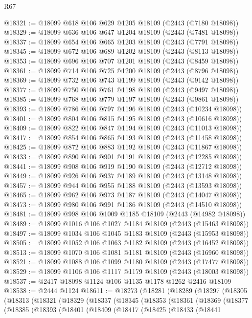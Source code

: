 \begin{lexlean}{R67}
\begin{coremodule}
@18321 := @18099 @618 @106 @629 @1205 @18109 (@2443 (@7180 @18098))
@18329 := @18099 @636 @106 @647 @1204 @18109 (@2443 (@7481 @18098))
@18337 := @18099 @654 @106 @665 @1203 @18109 (@2443 (@7791 @18098))
@18345 := @18099 @672 @106 @689 @1202 @18109 (@2443 (@8113 @18098))
@18353 := @18099 @696 @106 @707 @1201 @18109 (@2443 (@8459 @18098))
@18361 := @18099 @714 @106 @725 @1200 @18109 (@2443 (@8796 @18098))
@18369 := @18099 @732 @106 @743 @1199 @18109 (@2443 (@9142 @18098))
@18377 := @18099 @750 @106 @761 @1198 @18109 (@2443 (@9497 @18098))
@18385 := @18099 @768 @106 @779 @1197 @18109 (@2443 (@9861 @18098))
@18393 := @18099 @786 @106 @797 @1196 @18109 (@2443 (@10234 @18098))
@18401 := @18099 @804 @106 @815 @1195 @18109 (@2443 (@10616 @18098))
@18409 := @18099 @822 @106 @847 @1194 @18109 (@2443 (@11013 @18098))
@18417 := @18099 @854 @106 @865 @1193 @18109 (@2443 (@11458 @18098))
@18425 := @18099 @872 @106 @883 @1192 @18109 (@2443 (@11867 @18098))
@18433 := @18099 @890 @106 @901 @1191 @18109 (@2443 (@12285 @18098))
@18441 := @18099 @908 @106 @919 @1190 @18109 (@2443 (@12712 @18098))
@18449 := @18099 @926 @106 @937 @1189 @18109 (@2443 (@13148 @18098))
@18457 := @18099 @944 @106 @955 @1188 @18109 (@2443 (@13593 @18098))
@18465 := @18099 @962 @106 @973 @1187 @18109 (@2443 (@14047 @18098))
@18473 := @18099 @980 @106 @991 @1186 @18109 (@2443 (@14510 @18098))
@18481 := @18099 @998 @106 @1009 @1185 @18109 (@2443 (@14982 @18098))
@18489 := @18099 @1016 @106 @1027 @1184 @18109 (@2443 (@15463 @18098))
@18497 := @18099 @1034 @106 @1045 @1183 @18109 (@2443 (@15953 @18098))
@18505 := @18099 @1052 @106 @1063 @1182 @18109 (@2443 (@16452 @18098))
@18513 := @18099 @1070 @106 @1081 @1181 @18109 (@2443 (@16960 @18098))
@18521 := @18099 @1088 @106 @1099 @1180 @18109 (@2443 (@17477 @18098))
@18529 := @18099 @1106 @106 @1117 @1179 @18109 (@2443 (@18003 @18098))
@18537 := @2417 @18098 @1124 @106 @1135 @1178 @1262 @2416 @18109
@18538 := @2444 @1124
@18611 := @18273
    (@18281
      (@18289
        (@18297
          (@18305
            (@18313
              (@18321
                (@18329
                  (@18337
                    (@18345
                      (@18353
                        (@18361
                          (@18369
                            (@18377
                              (@18385
                                (@18393
                                  (@18401
                                    (@18409
                                      (@18417
                                        (@18425
                                          (@18433
                                            (@18441

\end{coremodule}
\end{lexlean}
